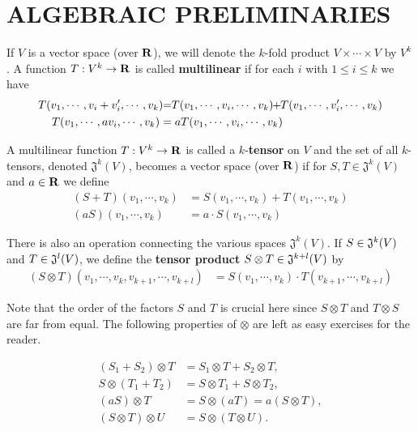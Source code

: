 \section{ALGEBRAIC PRELIMINARIES}
If $V$ is a vector space (over $\mathbf{R}$), we will denote the $k$-fold
product $V\times \cdots \times V$ by $V^k$. A function $T:V^k\to \mathbf{R}$
is called \textbf{multilinear} if for each $i$ with $1\le i\le k$ we have 
\begin{align*}
    T(v_1, \cdots, v_i+v_i', \cdots, v_k)
        \hspace*{-3pt}& =\hspace*{-3pt} T(v_1, \cdots, v_i, \cdots, v_k)
        \hspace*{-3pt}+\hspace*{-3pt} T(v_1, \cdots, v_i', \cdots, v_k) \\
    T(v_1, \cdots, av_i, \cdots, v_k) 
        & = aT(v_1, \cdots, v_i,\cdots, v_k)
\end{align*}

A multilinear function $T:V^k\to\mathbf{R}$ is called a $k$-\textbf{tensor} on $V$
and the set of all $k$-tensors, denoted $\mathfrak{J}^k(V)$, becomes a vector
space (over $\mathbf{R}$) if for $S,T \in \mathfrak{J}^k(V)$ and $a\in \mathbf{R}$ we define 
\begin{align*}
    (S+T)(v_1, \cdots, v_k) 
        & = S(v_1, \cdots, v_k)  + T(v_1, \cdots, v_k) \\
    (aS)(v_1, \cdots, v_k) & = a \cdot S(v_1, \cdots, v_k) 
\end{align*}

There is also an operation connecting the various spaces $\mathfrak{J}^k(V)$.
If $S\in \mathfrak{J}^k(V)$ and $T\in \mathfrak{J}^l(V)$, we define the \textbf{tensor product}
$S\otimes T \in \mathfrak{J}^{k+l}(V)$ by
\begin{align*}
    (S\otimes T)(v_1, \cdots, v_k, v_{k+1},\cdots, v_{k+l})
        & = S(v_1, \cdots, v_k) \cdot T(v_{k+1}, \cdots, v_{k+l})
\end{align*}

Note that the order of the factors $S$ and $T$ is crucial here since
$S\otimes T$ and $T\otimes S$ are far from equal. The following 
properties of $\otimes$ are left as easy exercises for the reader.

\begin{align*}
    (S_1+S_2)\otimes T& =S_1\otimes T+S_2\otimes T,  \\
    S\otimes(T_1+T_2)& =S\otimes T_1+S\otimes T_2,  \\
    (a S)\otimes T& =S\otimes(aT)=a(S\otimes T),  \\
    (S \otimes T)\otimes U& =S\otimes(T\otimes U). 
\end{align*}

